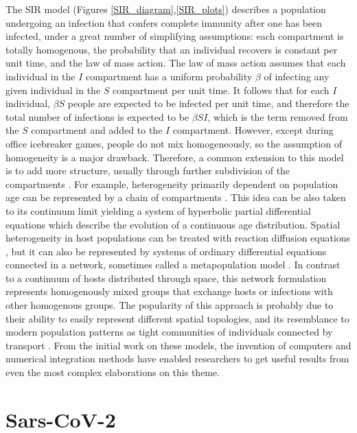 The SIR model (Figures \ref{SIR_diagram},\ref{SIR_plots}) describes a population undergoing an infection that confers complete immunity after one has been infected, under a great number of simplifying assumptions: each compartment is totally homogenous, the probability that an individual recovers is constant per unit time, and the law of mass action. The law of mass action assumes that each individual in the $I$ compartment has a uniform probability $\beta$ of infecting any given individual in the $S$ compartment per unit time. It follows that for each $I$ individual, $\beta S$ people are expected to be infected per unit time, and therefore the total number of infections is expected to be $\beta S I$, which is the term removed from the $S$ compartment and added to the $I$ compartment. However, except during office icebreaker games, people do not mix homogeneously, so the assumption of homogeneity is a major drawback. Therefore, a common extension to this model is to add more structure, usually through further subdivision of the compartments \cite{hethcote2000mathematics}. For example, heterogeneity primarily dependent on population age can be represented by a chain of compartments \cite{hethcote1997age}. This idea can be also taken to its continuum limit yielding a system of hyperbolic partial differential equations \cite{anderson1985vaccination} which describe the evolution of a continuous age distribution. Spatial heterogeneity in host populations can be treated with reaction diffusion equations \cite{rass2003spatial}, but it can also be represented by systems of ordinary differential equations connected in a network, sometimes called a metapopulation model \cite{house2008deterministic,levins1969some,colizza2007invasion, nowzari2016analysis}. In contrast to a continuum of hosts distributed through space, this network formulation represents homogenously mixed groups that exchange hosts or infections with other homogenous groups. The popularity of this approach is probably due to their ability to easily represent different spatial topologies, and its resemblance to modern population patterns as tight communities of individuals connected by transport \cite{ball2015seven}. From the initial work on these models, the invention of computers and numerical integration methods have enabled researchers to get useful results from even the most complex elaborations on this theme. 

\section{Sars-CoV-2}


